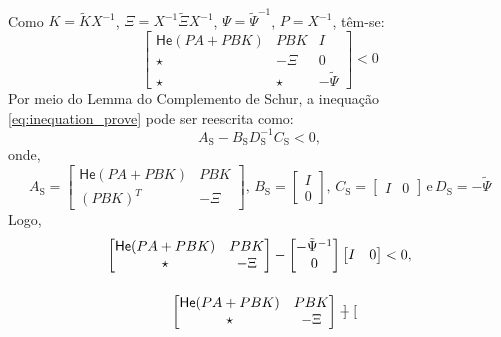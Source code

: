 \begin{gather}
\end{gather} Como $K = \tilde{K}X^{-1}$, $\Xi= X^{-1}\tilde{\Xi}X^{-1}$, $\Psi = \tilde{\Psi}^{-1}$, $P = X^{-1}$, têm-se: \begin{equation}
  \begin{bmatrix}
    \mathsf{He}(PA +PBK) & PBK   & I             \\
    \star                & -\Xi  & 0             \\
    \star                & \star & -\tilde{\Psi}
  \end{bmatrix} < 0
  \label{eq:inequation_prove}
\end{equation} Por meio do Lemma do Complemento de Schur, a inequação \eqref{eq:inequation_prove} pode ser reescrita como: \begin{equation}
  A_{\mathrm{S}} - B_{\mathrm{S}}D_{\mathrm{S}}^{-1}C_{\mathrm{S}} < 0,
\end{equation} onde, \begin{equation}
  A_{\mathrm{S}} = \begin{bmatrix}
    \mathsf{He}(PA +PBK) & PBK  \\
    (PBK)^T              & -\Xi
  \end{bmatrix}, \,
  B_{\mathrm{S}} = \begin{bmatrix}
    I \\ 0
  \end{bmatrix}, \,
  C_{\mathrm{S}} = \begin{bmatrix}
    I & 0
  \end{bmatrix} \, \mathrm{e} \,
  D_{\mathrm{S}} = -\tilde{\Psi}
\end{equation} Logo, \begin{gather}
  \begin{bmatrix}
    \mathsf{He}(PA +PBK) & PBK  \\
    \star                & -\Xi
  \end{bmatrix} -
  \begin{bmatrix}
    -\tilde{\Psi}^{-1} \\ 0
  \end{bmatrix}
  \begin{bmatrix}
    I & 0
  \end{bmatrix} < 0, \notag \notag \\[12pt]
  \begin{bmatrix}
    \mathsf{He}(PA +PBK) & PBK  \\
    \star                & -\Xi
  \end{bmatrix} -
  \begin{bmatrix}

\end{bmatrix}
\end{gather}
